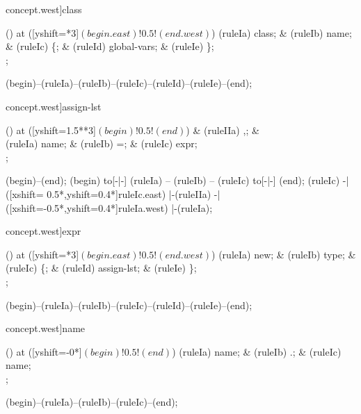 \begin{syntax}[[xshift=22mm]concept.west]{class}
  
  \node[sequence,anchor=north] () at ([yshift=\syntaxrulenodeheight-0.8pt*3]$(begin.east)!0.5!(end.west)$) {
    \node[terminal]    (ruleIa) {class};
    &
    \node[terminal]    (ruleIb) {name};
    &
    \node[terminal]    (ruleIc) {\{};
    &
    \node[nonterminal] (ruleId) {global-vars};
    &
    \node[terminal]    (ruleIe) {\}};
    \\
  };
  
  \draw[path] (begin)--(ruleIa)--(ruleIb)--(ruleIc)--(ruleId)--(ruleIe)--(end);
\end{syntax}

\begin{syntax}[[xshift=22mm]concept.west]{assign-lst}
  
  \node[sequence] () at ([yshift=1.5*\syntaxruledist-0.8pt*3]$(begin)!0.5!(end)$) {
    &
    \node[terminal]    (ruleIIa) {,}; %
    &
    \\
    \node[nonterminal] (ruleIa) {name};
    &
    \node[terminal]    (ruleIb) {=};
    &
    \node[nonterminal] (ruleIc) {expr};
    \\
  };
  
  \draw[path] (begin)--(end);
  \draw[path] (begin) to[-|-] (ruleIa) -- (ruleIb) -- (ruleIc) to[-|-] (end);
  \draw[path] (ruleIc)
            -|([xshift= 0.5*\syntaxruledist,yshift=0.4*\syntaxruledist]ruleIc.east)
            |-(ruleIIa)
            -|([xshift=-0.5*\syntaxruledist,yshift=0.4*\syntaxruledist]ruleIa.west)
            |-(ruleIa);
\end{syntax}

\begin{syntax}[[xshift=22mm]concept.west]{expr}
  
  \node[sequence,anchor=north] () at ([yshift=\syntaxrulenodeheight-0.8pt*3]$(begin.east)!0.5!(end.west)$) {
    \node[terminal]    (ruleIa) {new};
    &
    \node[terminal]    (ruleIb) {type};
    &
    \node[terminal]    (ruleIc) {\{};
    &
    \node[nonterminal] (ruleId) {assign-lst};
    &
    \node[terminal]    (ruleIe) {\}};
    \\
  };
  
  \draw[path] (begin)--(ruleIa)--(ruleIb)--(ruleIc)--(ruleId)--(ruleIe)--(end);
\end{syntax}

\begin{syntax}[[xshift=22mm]concept.west]{name}
  
  \node[sequence] () at ([yshift=-0*\syntaxruledist]$(begin)!0.5!(end)$) {
    \node[terminal]    (ruleIa) {name};
    &
    \node[nonterminal] (ruleIb) {.};
    &
    \node[terminal]    (ruleIc) {name};
    \\
  };
  
  \draw[path] (begin)--(ruleIa)--(ruleIb)--(ruleIc)--(end);
\end{syntax}
